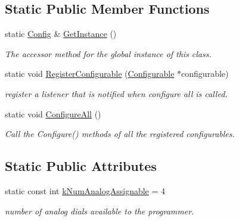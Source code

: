 \subsection*{\-Static \-Public \-Member \-Functions}
\begin{DoxyCompactItemize}
\item 
\hypertarget{class_config_a8d16346252818f578e1232bab86cdaef}{
static \hyperlink{class_config}{\-Config} \& \hyperlink{class_config_a8d16346252818f578e1232bab86cdaef}{\-Get\-Instance} ()}
\label{class_config_a8d16346252818f578e1232bab86cdaef}

\begin{DoxyCompactList}\small\item\em \-The accessor method for the global instance of this class. \end{DoxyCompactList}\item 
\hypertarget{class_config_ac9bb425d0132c84317e9e3528dbf97fb}{
static void \hyperlink{class_config_ac9bb425d0132c84317e9e3528dbf97fb}{\-Register\-Configurable} (\hyperlink{class_configurable}{\-Configurable} $\ast$configurable)}
\label{class_config_ac9bb425d0132c84317e9e3528dbf97fb}

\begin{DoxyCompactList}\small\item\em register a listener that is notified when configure all is called. \end{DoxyCompactList}\item 
\hypertarget{class_config_a93caf01e5a4e8adaef68802ce13161be}{
static void \hyperlink{class_config_a93caf01e5a4e8adaef68802ce13161be}{\-Configure\-All} ()}
\label{class_config_a93caf01e5a4e8adaef68802ce13161be}

\begin{DoxyCompactList}\small\item\em \-Call the \-Configure() methods of all the registered configurables. \end{DoxyCompactList}\end{DoxyCompactItemize}
\subsection*{\-Static \-Public \-Attributes}
\begin{DoxyCompactItemize}
\item 
\hypertarget{class_config_a1b3d97e9d23cfbd209a171302eb8bc82}{
static const int \hyperlink{class_config_a1b3d97e9d23cfbd209a171302eb8bc82}{k\-Num\-Analog\-Assignable} = 4}
\label{class_config_a1b3d97e9d23cfbd209a171302eb8bc82}

\begin{DoxyCompactList}\small\item\em number of analog dials available to the programmer. \end{DoxyCompactList}\end{DoxyCompactItemize}


